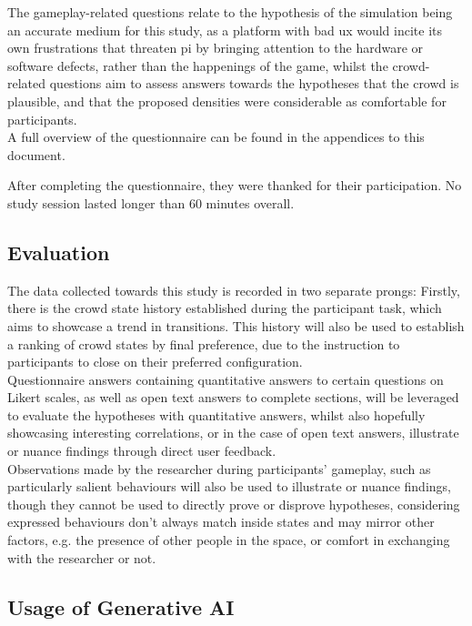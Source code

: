 The gameplay-related questions relate to the hypothesis of the simulation being an accurate medium for this study, as a platform with bad \gls{ux} would incite its own frustrations that threaten \gls{pi} by bringing attention to the hardware or software defects, rather than the happenings of the game, whilst the crowd-related questions aim to assess answers towards the hypotheses that the crowd is plausible, and that the proposed densities were considerable as comfortable for participants.\\

A full overview of the questionnaire can be found in the appendices to this document.

After completing the questionnaire, they were thanked for their participation. No study session lasted longer than 60 minutes overall.

\subsection{Evaluation}

The data collected towards this study is recorded in two separate prongs: Firstly, there is the crowd state history established during the participant task, which aims to showcase a trend in transitions. This history will also be used to establish a ranking of crowd states by final preference, due to the instruction to participants to close on their preferred configuration.\\
Questionnaire answers containing quantitative answers to certain questions on Likert scales, as well as open text answers to complete sections, will be leveraged to evaluate the hypotheses with quantitative answers, whilst also hopefully showcasing interesting correlations, or in the case of open text answers, illustrate or nuance findings through direct user feedback.\\

Observations made by the researcher during participants' gameplay, such as particularly salient behaviours will also be used to illustrate or nuance findings, though they cannot be used to directly prove or disprove hypotheses, considering expressed behaviours don't always match inside states and may mirror other factors, e.g. the presence of other people in the space, or comfort in exchanging with the researcher or not.

\subsection{Usage of Generative AI}

